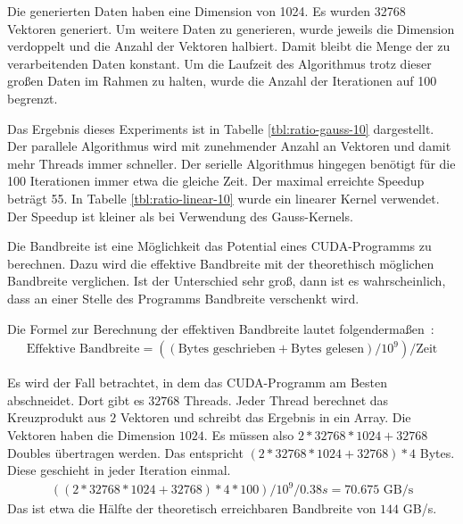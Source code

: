 \documentclass[ngerman]{scrartcl}
\begin{document}
Die generierten Daten haben eine Dimension von 1024. Es wurden 32768 Vektoren generiert. Um weitere Daten zu generieren, wurde jeweils die Dimension verdoppelt und die Anzahl der Vektoren halbiert. Damit bleibt die Menge der zu verarbeitenden Daten konstant. Um die Laufzeit des Algorithmus trotz dieser großen Daten im Rahmen zu halten, wurde die Anzahl der Iterationen auf 100 begrenzt.

Das Ergebnis dieses Experiments ist in Tabelle \ref{tbl:ratio-gauss-10} dargestellt. Der parallele Algorithmus wird mit zunehmender Anzahl an Vektoren und damit mehr Threads immer schneller. Der serielle Algorithmus hingegen benötigt für die 100 Iterationen immer etwa die gleiche Zeit. Der maximal erreichte Speedup beträgt 55. 
In Tabelle \ref{tbl:ratio-linear-10} wurde ein linearer Kernel verwendet. Der Speedup ist kleiner als bei Verwendung des Gauss-Kernels. %

Die Bandbreite ist eine Möglichkeit das Potential eines CUDA-Programms zu berechnen. Dazu wird die effektive Bandbreite mit der theorethisch möglichen Bandbreite verglichen.
Ist der Unterschied sehr groß, dann ist es wahrscheinlich, dass an einer Stelle des Programms Bandbreite verschenkt wird.

Die Formel zur Berechnung der effektiven Bandbreite lautet folgendermaßen~\cite{cudabestpracticeguide}:
\begin{align}
\text{Effektive Bandbreite} = (( \text{Bytes geschrieben} + \text{Bytes gelesen} ) / 10^9 ) / \text{Zeit}
\end{align}

Es wird der Fall betrachtet, in dem das CUDA-Programm am Besten abschneidet. 
Dort gibt es $ 32768$ Threads. Jeder Thread berechnet das Kreuzprodukt aus $2$ Vektoren und schreibt das Ergebnis in ein Array. Die Vektoren haben die Dimension $1024$. Es müssen also $2 * 32768 * 1024 + 32768$ Doubles übertragen werden. Das entspricht $(2 * 32768 * 1024 + 32768) * 4$ Bytes. Diese geschieht in jeder Iteration einmal. 
\begin{align}
((2 * 32768 * 1024 + 32768) * 4 * 100) / 10^9 / 0.38s = 70.675 \text{ GB/s}
\end{align}
Das ist etwa die Hälfte der theoretisch erreichbaren Bandbreite von $144$ GB/s.
\end{document}
